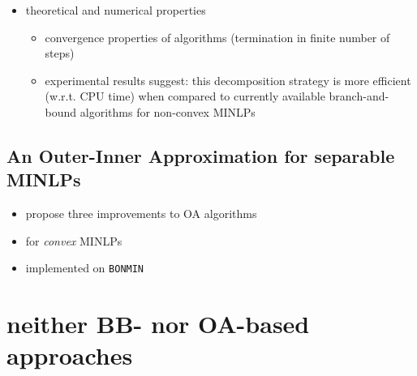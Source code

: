\documentclass{article}
\begin{document}
\begin{itemize}
\begin{itemize}
	\end{itemize}
\item theoretical and numerical properties
	\begin{itemize}
	\item convergence properties of algorithms (termination in finite number of steps)
	\item experimental results suggest: this decomposition strategy is more efficient (w.r.t. CPU time) when compared to currently available branch-and-bound algorithms for non-convex MINLPs
	\end{itemize}
\end{itemize}

\subsection{An Outer-Inner Approximation for separable MINLPs}
\begin{itemize}
\item propose three improvements to OA algorithms
\item for \emph{convex} MINLPs
\item implemented on \texttt{BONMIN}
\end{itemize}

\newpage
\section{neither BB- nor OA-based approaches}
\end{document}
